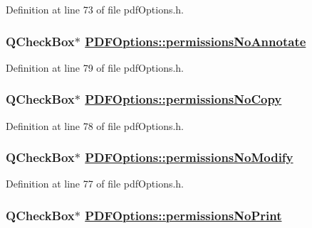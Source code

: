 Definition at line 73 of file pdf\-Options.h.\hypertarget{classPDFOptions_r39}{
\subsubsection[permissionsNoAnnotate]{\setlength{\rightskip}{0pt plus 5cm}QCheck\-Box$\ast$ \hyperlink{classPDFOptions_r39}{PDFOptions::permissions\-No\-Annotate}}}
\label{classPDFOptions_r39}


Definition at line 79 of file pdf\-Options.h.\hypertarget{classPDFOptions_r38}{
\subsubsection[permissionsNoCopy]{\setlength{\rightskip}{0pt plus 5cm}QCheck\-Box$\ast$ \hyperlink{classPDFOptions_r38}{PDFOptions::permissions\-No\-Copy}}}
\label{classPDFOptions_r38}


Definition at line 78 of file pdf\-Options.h.\hypertarget{classPDFOptions_r37}{
\subsubsection[permissionsNoModify]{\setlength{\rightskip}{0pt plus 5cm}QCheck\-Box$\ast$ \hyperlink{classPDFOptions_r37}{PDFOptions::permissions\-No\-Modify}}}
\label{classPDFOptions_r37}


Definition at line 77 of file pdf\-Options.h.\hypertarget{classPDFOptions_r36}{
\subsubsection[permissionsNoPrint]{\setlength{\rightskip}{0pt plus 5cm}QCheck\-Box$\ast$ \hyperlink{classPDFOptions_r36}{PDFOptions::permissions\-No\-Print}}}
\label{classPDFOptions_r36}


